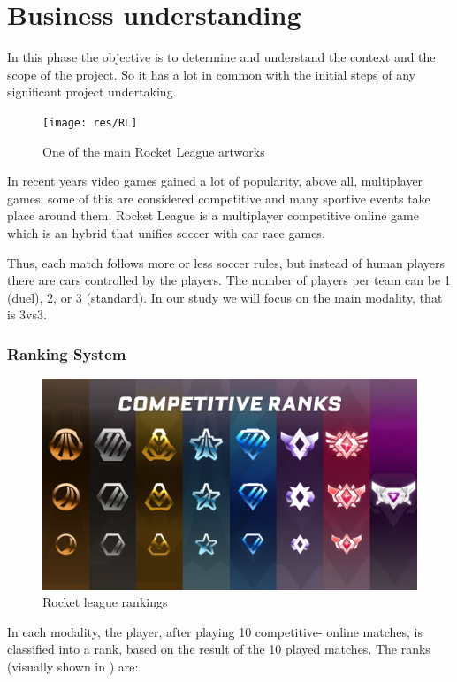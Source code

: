 \section{Business understanding} \label{seq:business}

 In this phase the objective is to determine and understand the context and the scope of the project. So it has a lot in common with the initial steps of any significant project undertaking.

\begin{figure}[h]
    \texttt{[image: res/RL]}
    \caption{One of the main Rocket League artworks}
\end{figure}

In recent years video games gained a lot of popularity, above all, multiplayer games; some of this are considered competitive and many sportive events take place around them.
Rocket League is a multiplayer competitive online game which is an hybrid that unifies soccer with car race games.

Thus, each match follows more or less soccer rules, but instead of human players there are cars controlled by the players. The number of players per team can be 1 (duel), 2, or 3 (standard). In our study we will focus on the main modality, that is 3vs3.

\subsubsection{Ranking System}

\begin{figure}[h]
    \includegraphics[width=\linewidth]{res/rankings}
    \caption{Rocket league rankings}
    \label{fig:ranks}
\end{figure}

In each modality, the player, after playing 10 competitive- online matches, is classified into a rank, based on the result of the 10 played matches. The ranks (visually shown in ) are: 


